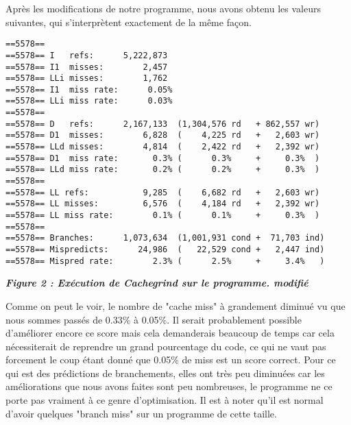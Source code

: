 \documentclass{report}
\begin{document}
Après les modifications de notre programme, nous avons obtenu les valeurs suivantes, qui s’interprètent exactement de la même façon.
\begin{scriptsize}
\begin{lstlisting}
==5578== 
==5578== I   refs:      5,222,873
==5578== I1  misses:        2,457
==5578== LLi misses:        1,762
==5578== I1  miss rate:      0.05%
==5578== LLi miss rate:      0.03%
==5578== 
==5578== D   refs:      2,167,133  (1,304,576 rd   + 862,557 wr)
==5578== D1  misses:        6,828  (    4,225 rd   +   2,603 wr)
==5578== LLd misses:        4,814  (    2,422 rd   +   2,392 wr)
==5578== D1  miss rate:       0.3% (      0.3%     +     0.3%  )
==5578== LLd miss rate:       0.2% (      0.2%     +     0.3%  )
==5578== 
==5578== LL refs:           9,285  (    6,682 rd   +   2,603 wr)
==5578== LL misses:         6,576  (    4,184 rd   +   2,392 wr)
==5578== LL miss rate:        0.1% (      0.1%     +     0.3%  )
==5578== 
==5578== Branches:      1,073,634  (1,001,931 cond +  71,703 ind)
==5578== Mispredicts:      24,986  (   22,529 cond +   2,447 ind)
==5578== Mispred rate:        2.3% (      2.5%     +     3.4%   )
\end{lstlisting}
\begin{center}
\textbf{\textit{Figure 2 : Exécution de Cachegrind sur le programme. modifié}}
\end{center}

Comme on peut le voir, le nombre de "cache miss" à grandement diminué vu que nous sommes passés de 0.33\% à 0.05\%. 
\newline
Il serait probablement possible d'améliorer encore ce score mais cela demanderais beaucoup de temps car cela nécessiterait de reprendre un grand pourcentage du code, ce qui ne vaut pas forcement le coup étant donné que 0.05\% de miss est un score correct.
\newline
Pour ce qui est des prédictions de branchements, elles ont très peu diminuées car les améliorations que nous avons faites sont peu nombreuses, le programme ne ce porte pas vraiment à ce genre d'optimisation.
\newline
Il est à noter qu'il est normal d'avoir quelques "branch miss" sur un programme de cette taille.
\end{scriptsize}
\end{document}
